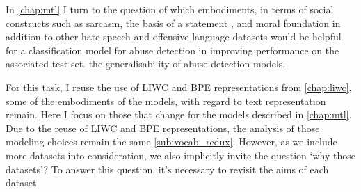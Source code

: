 {\color{orange!80!black}
In \autoref{chap:mtl} I turn to the question of which embodiments, in terms of social constructs such as sarcasm\citep{Oraby:2016}, the basis of a statement \citep{Oraby:2015}, and moral foundation \citep{Hoover:2019} in addition to other hate speech and offensive language datasets \citep{Waseem:2016,Waseem-Hovy:2016,Davidson:2017,Wulczyn:2016} would be helpful for a classification model for abuse detection in improving performance
on the associated test set.
the generalisability of abuse detection models.

For this task,  I reuse the use of LIWC and BPE representations from \autoref{chap:liwc}, some of the embodiments of the models, with regard to text representation remain. Here I focus on those that change for the models described in \autoref{chap:mtl}. Due to the reuse of LIWC and BPE representations, the analysis of those modeling choices remain the same \autoref{sub:vocab_redux}. However, as we include more datasets into consideration, we also implicitly invite the question `why those datasets'? To answer this question, it's necessary to revisit the aims of each dataset.

}

